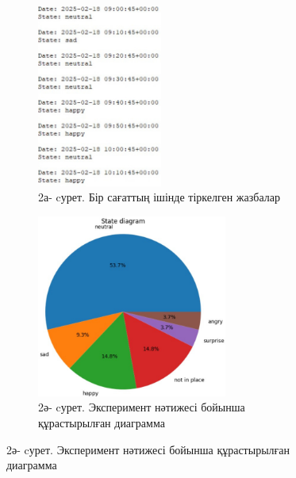 \begin{figure}[H]
	\centering
	\begin{subfigure}{0.48\textwidth}
		\centering
		\includegraphics[width=\textwidth, height=6cm, keepaspectratio]{media/ict2/image158}
		\caption*{2а- cурет. Бір сағаттың ішінде тіркелген жазбалар}
	\end{subfigure}
	\begin{subfigure}{0.48\textwidth}
		\centering
		\includegraphics[width=\textwidth, height=6cm, keepaspectratio]{media/ict2/image159}
		\caption*{2ә- cурет. Эксперимент нәтижесі бойынша құрастырылған диаграмма}
	\end{subfigure}
\end{figure}

